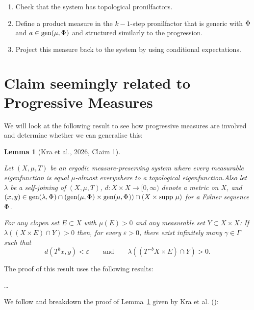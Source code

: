 \documentclass[
  british,
]{article}
\providecommand{\tightlist}{%
  \setlength{\itemsep}{0pt}\setlength{\parskip}{0pt}}
\theoremstyle{plain}
\theoremstyle{plain}
\newtheorem{lemma}{Lemma}[section]
\theoremstyle{plain}
\theoremstyle{definition}
\theoremstyle{remark}
\newcommand{\Folner}[1][\vphantom{}]{{\Phi}_{#1}}
\newcommand{\Group}{{\Gamma}}
\newcommand{\GroupElement}{{\gamma}}
\newcommand{\Measure}{{\mu}}
\begin{document}
\begin{enumerate}
\def\labelenumi{\arabic{enumi}.}
\tightlist
\item
  Check that the system has topological pronilfactors.
\item
  Define a product measure in the \(k-1\)-step pronilfactor that is
  generic with \(\Folner\) and \(a\in\text{gen}(\mu,\Folner)\) and
  structured similarly to the progression.
\item
  Project this measure back to the system by using conditional
  expectations.
\end{enumerate}

\section{Claim seemingly related to Progressive
Measures}\label{claim-seemingly-related-to-progressive-measures}

We will look at the following result to see how progressive measures are
involved and determine whether we can generalise this:

\begin{lemma}[{Kra et al., 2026, Claim
1}]\protect\hypertarget{lem-ProgressiveRecurrence}{}\label{lem-ProgressiveRecurrence}

Let \((X,\Measure,T)\) be an ergodic measure-preserving system where
every measurable eigenfunction is equal \(\Measure\)-almost everywhere
to a topological eigenfunction.Also let \(\lambda\) be a self-joining of
\((X,\Measure,T)\), \(d:X\times X\rightarrow[0,\infty)\) denote a metric
on \(X\), and
\((x,y)\in\text{gen}(\lambda,\Folner)\cap(\text{gen}(\Measure,\Folner)\times\text{gen}(\Measure,\Folner))\cap(X\times\text{supp }\Measure)\)
for a Følner sequence \(\Folner\).

For any clopen set \(E\subset X\) with \(\Measure(E)>0\) and any
measurable set \(Y\subset X\times X\): If
\(\lambda\left((X\times E)\cap Y\right)>0\) then, for every
\(\varepsilon>0\), there exist infinitely many
\(\GroupElement\in\Group\) such that \[
d(T^bx,y)<\varepsilon\qquad\text{and}\qquad\lambda\left((T^{-b}X\times E)\cap Y\right)>0.
\]

\end{lemma}

The proof of this result uses the following results:

\ldots{}

We follow and breakdown the proof of
Lemma~\ref{lem-ProgressiveRecurrence} given by Kra et al.
():
\end{document}
